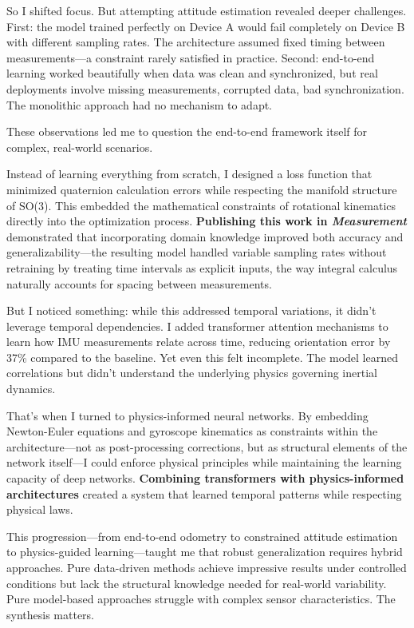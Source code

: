 \documentclass[12pt]{article}
\begin{document}
So I shifted focus. But attempting attitude estimation revealed deeper challenges. First: the model trained perfectly on Device A would fail completely on Device B with different sampling rates. The architecture assumed fixed timing between measurements—a constraint rarely satisfied in practice. Second: end-to-end learning worked beautifully when data was clean and synchronized, but real deployments involve missing measurements, corrupted data, bad synchronization. The monolithic approach had no mechanism to adapt.

These observations led me to question the end-to-end framework itself for complex, real-world scenarios.

Instead of learning everything from scratch, I designed a loss function that minimized quaternion calculation errors while respecting the manifold structure of SO(3). This embedded the mathematical constraints of rotational kinematics directly into the optimization process. \textbf{Publishing this work in \textit{Measurement}} demonstrated that incorporating domain knowledge improved both accuracy and generalizability—the resulting model handled variable sampling rates without retraining by treating time intervals as explicit inputs, the way integral calculus naturally accounts for spacing between measurements.

But I noticed something: while this addressed temporal variations, it didn't leverage temporal dependencies. I added transformer attention mechanisms to learn how IMU measurements relate across time, reducing orientation error by 37\% compared to the baseline. Yet even this felt incomplete. The model learned correlations but didn't understand the underlying physics governing inertial dynamics.

That's when I turned to physics-informed neural networks. By embedding Newton-Euler equations and gyroscope kinematics as constraints within the architecture—not as post-processing corrections, but as structural elements of the network itself—I could enforce physical principles while maintaining the learning capacity of deep networks. \textbf{Combining transformers with physics-informed architectures} created a system that learned temporal patterns while respecting physical laws.

This progression—from end-to-end odometry to constrained attitude estimation to physics-guided learning—taught me that robust generalization requires hybrid approaches. Pure data-driven methods achieve impressive results under controlled conditions but lack the structural knowledge needed for real-world variability. Pure model-based approaches struggle with complex sensor characteristics. The synthesis matters.
\end{document}
